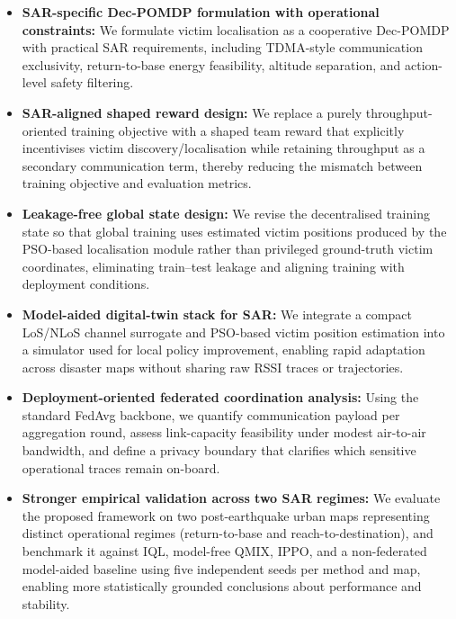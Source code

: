 \documentclass[drones,article,accept,pdftex,moreauthors]{Definitions/mdpi}
\begin{document}
\begin{itemize}[leftmargin=*,noitemsep]
    \item \textbf{SAR-specific Dec-POMDP formulation with operational constraints:}
    We formulate victim localisation as a cooperative Dec-POMDP with practical SAR requirements, including TDMA-style communication exclusivity, return-to-base energy feasibility, altitude separation, and action-level safety filtering.

    \item \textbf{SAR-aligned shaped reward design:}
    We replace a purely throughput-oriented training objective with a shaped team reward that explicitly incentivises victim discovery/localisation while retaining throughput as a secondary communication term, thereby reducing the mismatch between training objective and evaluation metrics.

    \item \textbf{Leakage-free global state design:}
    We revise the decentralised training state so that global training uses estimated victim positions produced by the PSO-based localisation module rather than privileged ground-truth victim coordinates, eliminating train--test leakage and aligning training with deployment conditions.

    \item \textbf{Model-aided digital-twin stack for SAR:}
    We integrate a compact LoS/NLoS channel surrogate and PSO-based victim position estimation into a simulator used for local policy improvement, enabling rapid adaptation across disaster maps without sharing raw RSSI traces or trajectories.

    \item \textbf{Deployment-oriented federated coordination analysis:}
    Using the standard FedAvg backbone, we quantify communication payload per aggregation round, assess link-capacity feasibility under modest air-to-air bandwidth, and define a privacy boundary that clarifies which sensitive operational traces remain on-board.

    \item \textbf{Stronger empirical validation across two SAR regimes:}
    We evaluate the proposed framework on two post-earthquake urban maps representing distinct operational regimes (return-to-base and reach-to-destination), and benchmark it against IQL, model-free QMIX, IPPO, and a non-federated model-aided baseline using five independent seeds per method and map, enabling more statistically grounded conclusions about performance and stability.
\end{itemize}
\end{document}
